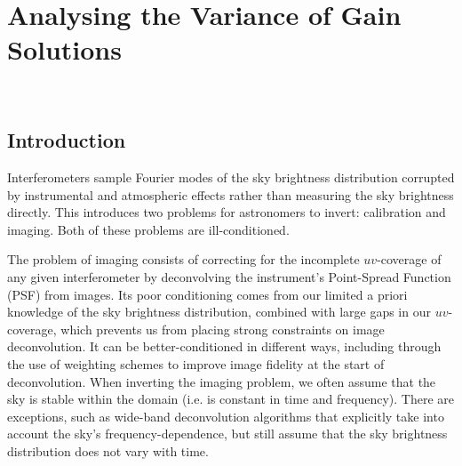 \chapter{Analysing the Variance of Gain Solutions}\label{chapter.paper}
\minitoc

\

\section{Introduction}\label{sec.intro}

\pg
Interferometers sample Fourier modes of the sky brightness distribution corrupted by instrumental and atmospheric effects rather than measuring the sky brightness directly.
This introduces two problems for astronomers to invert: calibration and imaging. Both of these problems are ill-conditioned.

\pg
The problem of imaging consists of correcting for the incomplete $uv$-coverage of any given interferometer by deconvolving the instrument's {Point-Spread Function (PSF)} from images. Its poor conditioning comes from our limited a priori knowledge of the sky brightness distribution, combined with large gaps in our $uv$-coverage, which prevents us from placing strong constraints on image deconvolution. It can be better-conditioned in different ways, including through the use of weighting schemes \citep[see][and references therein]{1995AAS...18711202B,2014MNRAS.444..790Y} to improve image fidelity at the start of deconvolution. When inverting the imaging problem, we often assume that {the sky} is stable within the domain (i.e. {is} constant in time and frequency). There are exceptions, such as wide-band deconvolution algorithms \citep[e.g.][]{2011A&A...532A..71R} that explicitly take into account the {sky}'s frequency-dependence, but still assume that the sky brightness distribution does not vary with time.

